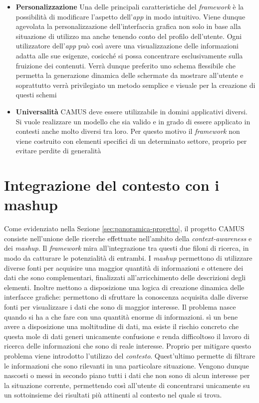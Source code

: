 \begin{itemize}
	\item \textbf{Personalizzazione}
	Una delle principali caratteristiche del \emph{framework} è la possibilità di modificare l'aspetto dell'\emph{app} in modo intuitivo. Viene dunque agevolata la personalizzazione dell'interfaccia grafica non solo in base alla situazione di utilizzo ma anche tenendo conto del profilo dell'utente. Ogni utilizzatore dell'\emph{app} può così avere una visualizzazione delle informazioni adatta alle sue esigenze, cosicché si possa concentrare esclusivamente sulla fruizione dei contenuti. Verrà dunque preferito uno schema flessibile che permetta la generazione dinamica delle schermate da mostrare all'utente e soprattutto verrà privilegiato un metodo semplice e visuale per la creazione di questi schemi
	\item \textbf{Universalità}
	CAMUS deve essere utilizzabile in domini applicativi diversi. Si vuole realizzare un modello che sia valido e in grado di essere applicato in contesti anche molto diversi tra loro. Per questo motivo il \emph{framework} non viene costruito con elementi specifici di un determinato settore, proprio per evitare perdite di generalità
\end{itemize}

\section{Integrazione del contesto con i mashup\label{sec:integrazione-contesto-mashup}}

Come evidenziato nella Sezione \ref{sec:panoramica-progetto}, il progetto CAMUS consiste nell'unione delle ricerche effettuate nell'ambito della \emph{context-awareness} e dei \emph{mashup}. Il \emph{framework} mira all'integrazione tra questi due filoni di ricerca, in modo da catturare le potenzialità di entrambi. I \emph{mashup} permettono di utilizzare diverse fonti per acquisire una maggior quantità di informazioni e ottenere dei dati che sono complementari, finalizzati all'arricchimento delle descrizioni degli elementi. Inoltre mettono a disposizione una logica di creazione dinamica delle interfacce grafiche: permettono di sfruttare la conoscenza acquisita dalle diverse fonti per visualizzare i dati che sono di maggior interesse. Il problema nasce quando si ha a che fare con una quantità enorme di informazioni. \upe sì un bene avere a disposizione una moltitudine di dati, ma esiste il rischio concreto che questa mole di dati generi unicamente confusione e renda difficoltoso il lavoro di ricerca delle informazioni che sono di reale interesse. Proprio per mitigare questo problema viene introdotto l'utilizzo del \emph{contesto}. Quest'ultimo permette di filtrare le informazioni che sono rilevanti in una particolare situazione. Vengono dunque nascosti o messi in secondo piano tutti i dati che non sono di alcun interesse per la situazione corrente, permettendo così all'utente di concentrarsi unicamente su un sottoinsieme dei risultati più attinenti al contesto nel quale si trova.

